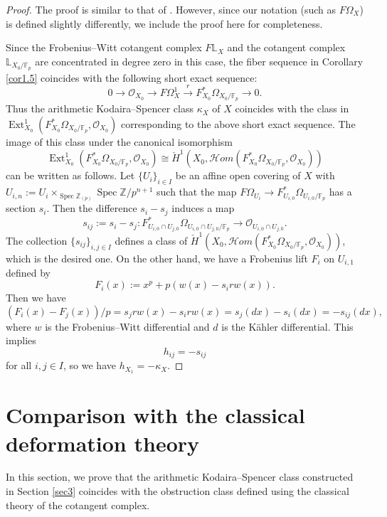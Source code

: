\documentclass[11pt, a4paper]{amsart}
\theoremstyle{plain}
\theoremstyle{definition}
\begin{document}
\begin{proof}
    The proof is similar to that of \cite[Theorem 3.2]{DKRZB17}. However, since our notation (such as $F\Omega_X$) is defined slightly differently, we include the proof here for completeness.

    Since the Frobenius--Witt cotangent complex $F\mathbb L_X$ and the cotangent complex $\mathbb L_{X_0/\mathbb F_p}$ are concentrated in degree zero in this case, the fiber sequence in Corollary \ref{cor1.5} coincides with the following short exact sequence:\[0\to \mathcal O_{X_0}\to F\Omega_X^1\xrightarrow[]{r} F_{X_0}^*\Omega_{X_0/\mathbb F_p}\to 0.\]
    Thus the arithmetic Kodaira--Spencer class $\kappa_X$ of $X$ coincides with the class in $\operatorname{Ext}^1_{X_0}(F^*_{X_0}\Omega_{X_0/\mathbb F_p},\mathcal O_{X_0})$ corresponding to the above short exact sequence. The image of this class under the canonical isomorphism\[\operatorname{Ext}^1_{X_0}(F^*_{X_0}\Omega_{X_0/\mathbb F_p},\mathcal O_{X_0})\cong \check H^1(X_0,\mathcal Hom(F^*_{X_0}\Omega_{X_0/\mathbb F_p},\mathcal O_{X_0}))\] can be written as follows. Let $\{U_i\}_{i\in I}$ be an affine open covering of $X$ with $U_{i,n}:=U_i\times_{\operatorname{Spec}\mathbb Z_{(p)}}\operatorname{Spec}\mathbb Z/p^{n+1}$ such that the map $F\Omega_{U_i}\to F^*_{U_{i,0}}\Omega_{U_{i,0}/\mathbb F_p}$ has a section $s_i$. Then the difference $s_i-s_j$ induces a map\[s_{ij}:=s_i-s_j:F^*_{U_{i,0}\cap U_{j,0}}\Omega_{U_{i,0}\cap U_{j,0}/\mathbb F_p}\to \mathcal O_{U_{i,0}\cap U_{j,0}}.\] The collection $\{s_{ij}\}_{i,j\in I}$ defines a class of $\check H^1(X_0,\mathcal Hom(F^*_{X_0}\Omega_{X_0/\mathbb F_p},\mathcal O_{X_0}))$, which is the desired one. On the other hand, we have a Frobenius lift $F_i$ on $U_{i,1}$ defined by \[F_i(x):=x^p+p(w(x)-s_irw(x)).\] Then we have\[(F_i(x)-F_j(x))/p=s_jrw(x)-s_irw(x)=s_j(dx)-s_i(dx)=-s_{ij}(dx),\] where $w$ is the Frobenius--Witt differential and $d$ is the K\"ahler differential.
    This implies \[h_{ij}=-s_{ij}\] for all $i,j\in I$, so we have $h_{X_1}=-\kappa_{X}$.  
\end{proof}



\section{Comparison with the classical deformation theory}\label{sec5}
In this section, we prove that the arithmetic Kodaira--Spencer class constructed in Section \ref{sec3} coincides with the obstruction class defined using the classical theory of the cotangent complex. 
\end{document}
